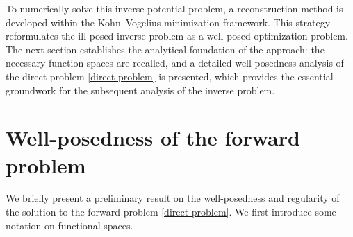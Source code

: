 \documentclass[a4paper,12pt,reqno,natbib]{amsart}
\begin{document}
To numerically solve this inverse potential problem, a reconstruction method is developed within the Kohn–Vogelius minimization framework. This strategy reformulates the ill-posed inverse problem as a well-posed optimization problem. The next section establishes the analytical foundation of the approach: the necessary function spaces are recalled, and a detailed well-posedness analysis of the direct problem \eqref{direct-problem} is presented, which provides the essential groundwork for the subsequent analysis of the inverse problem.

\section{Well-posedness of the forward problem}\label{sec:3}

We briefly present a preliminary result on the well-posedness and regularity of the solution to the forward problem \eqref{direct-problem}. We first introduce some notation on functional spaces.
\end{document}
